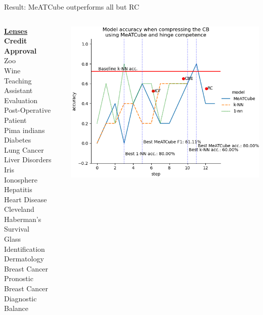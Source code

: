 \documentclass[]{beamer}
\begin{document}
\begin{frame}{Result: MeATCube outperforms all but RC}
    \begin{columns}
        \begin{column}{.35\textwidth}
            {\smaller\smaller
            \underline{\textbf{Lenses}} \\
            \textbf{Credit Approval} \\
            Zoo \\
            Wine \\
            Teaching Assistant Evaluation \\
            Post-Operative Patient \\
            Pima indians Diabetes \\
            Lung Cancer \\
            Liver Disorders \\
            Iris \\
            Ionosphere \\
            Hepatitis \\
            Heart Disease Cleveland \\
            Haberman's Survival \\
            Glass Identification \\
            Dermatology \\
            Breast Cancer Pronostic \\
            Breast Cancer Diagnostic \\
            Balance\\
            ~}
        \end{column}
        \begin{column}{.65\textwidth}
            \includegraphics[width=.8\textwidth]{../results/figs/lenses}

\end{column}
\end{columns}
\end{frame}
\end{document}
